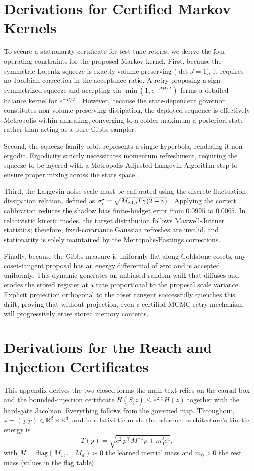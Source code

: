 \documentclass{article}
\newcommand{\R}{\mathbb{R}}
\newcommand{\detJ}{\det J}
\begin{document}
\section{Derivations for Certified Markov Kernels}
To secure a stationarity certificate for test-time retries, we derive the four operating constraints for the proposed Markov kernel. First, because the symmetric Lorentz squeeze is exactly volume-preserving ($\detJ=1$), it requires no Jacobian correction in the acceptance ratio. A retry proposing a sign-symmetrized squeeze and accepting via $\min(1,e^{-\Delta H/T})$ forms a detailed-balance kernel for $e^{-H/T}$ \citep{duane_hybrid_1987}. However, because the state-dependent governor constitutes non-volume-preserving dissipation, the deployed sequence is effectively Metropolis-within-annealing, converging to a colder maximum-a-posteriori state rather than acting as a pure Gibbs sampler.

Second, the squeeze family orbit represents a single hyperbola, rendering it non-ergodic. Ergodicity strictly necessitates momentum refreshment, requiring the squeeze to be layered with a Metropolis-Adjusted Langevin Algorithm step to ensure proper mixing across the state space \citep{brooks_mcmc_2011}.

Third, the Langevin noise scale must be calibrated using the discrete fluctuation-dissipation relation, defined as $\sigma_i^\star=\sqrt{M_{{\rm eff},i}T\gamma(2-\gamma)}$ \citep{roberts_exponential_1996}. Applying the correct calibration reduces the shadow bias finite-budget error from $0.0995$ to $0.0065$. In relativistic kinetic modes, the target distribution follows Maxwell-J\"uttner statistics; therefore, fixed-covariance Gaussian refreshes are invalid, and stationarity is solely maintained by the Metropolis-Hastings corrections.

Finally, because the Gibbs measure is uniformly flat along Goldstone cosets, any coset-tangent proposal has an energy differential of zero and is accepted uniformly. This dynamic generates an unbiased random walk that diffuses and erodes the stored register at a rate proportional to the proposal scale variance. Explicit projection orthogonal to the coset tangent successfully quenches this drift, proving that without projection, even a certified MCMC retry mechanism will progressively erase stored memory contents.

\section{Derivations for the Reach and Injection Certificates}
\label{app:deriv}
This appendix derives the two closed forms the main text relies on the causal box and the bounded-injection certificate $H(S_\zeta z)\le e^{2|\zeta|}H(z)$ together with the hard-gate Jacobian. Everything follows from the governed map. Throughout, $z=(q,p)\in\R^d\times\R^d$, and in relativistic mode the reference architecture's kinetic energy is
\[
T(p)=\sqrt{c^2\,p^\top M^{-1}p+m_0^2c^4},
\]
with $M=\mathrm{diag}(M_1,\dots,M_d)\succ0$ the learned inertial mass and $m_0>0$ the rest mass (values in the flag table).
\end{document}

